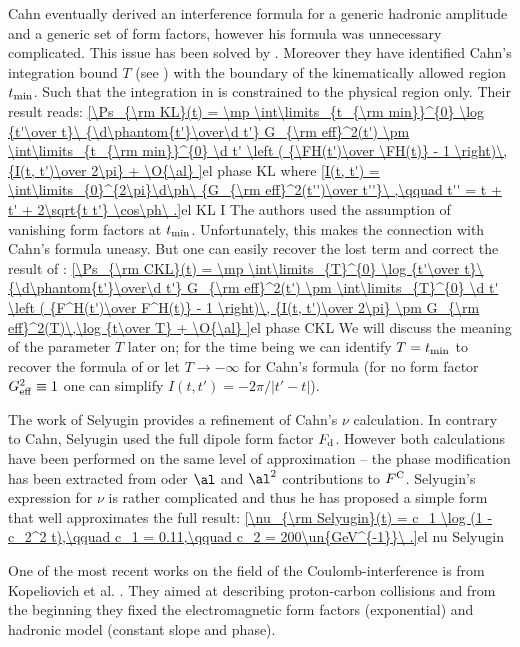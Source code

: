 Cahn eventually derived an interference formula for a generic hadronic amplitude and a generic set of form factors, however his formula was unnecessary complicated. This issue has been solved by \KaL{} . Moreover they have identified Cahn's integration bound $T$ (see ) with the boundary of the kinematically allowed region $t_{\rm min}$. Such that the integration in  is constrained to the physical region only. Their result reads:
\eqref{\Ps_{\rm KL}(t) =
	\mp \int\limits_{t_{\rm min}}^{0} \log {t'\over t}\ {\d\phantom{t'}\over\d t'} G_{\rm eff}^2(t')
	\pm \int\limits_{t_{\rm min}}^{0} \d t' \left ( {\FH(t')\over \FH(t)} - 1 \right)\, {I(t, t')\over 2\pi}
	+ \O{\al}
}{el phase KL}
where
\eqref{I(t, t') = \int\limits_{0}^{2\pi}\d\ph\ {G_{\rm eff}^2(t'')\over t''}\ ,\qquad t'' = t + t' + 2\sqrt{t t'} \cos\ph\ .}{el KL I}
The authors used the assumption of vanishing form factors at $t_{\rm min}$. Unfortunately, this makes the connection with Cahn's formula  uneasy. But one can easily recover the lost term and correct the result of \KL{}:
\eqref{\Ps_{\rm CKL}(t) =
	\mp \int\limits_{T}^{0} \log {t'\over t}\ {\d\phantom{t'}\over\d t'} G_{\rm eff}^2(t')
	\pm \int\limits_{T}^{0} \d t' \left ( {F^H(t')\over F^H(t)} - 1 \right)\, {I(t, t')\over 2\pi}
	\pm G_{\rm eff}^2(T)\,\log {t\over T}
	+ \O{\al}
}{el phase CKL}
We will discuss the meaning of the parameter $T$ later on; for the time being we can identify $T = t_{\rm min}$ to recover the formula of \KL{} or let $T\to -\infty$ for Cahn's formula (for no form factor $G_{\rm eff}^2 \equiv 1$ one can simplify $I(t, t') = -2\pi / |t' - t|$).

The work of Selyugin  provides a refinement of Cahn's $\nu$ calculation. In contrary to Cahn, Selyugin used the full dipole form factor $F_{\rm d}$. However both calculations have been performed on the same level of approximation -- the phase modification has been extracted from oder $\al$ and $\al^2$ contributions to $F^{\rm C}$. Selyugin's expression for $\nu$ is rather complicated and thus he has proposed a simple form that well approximates the full result:
\eqref{\nu_{\rm Selyugin}(t) = c_1 \log (1 - c_2^2 t),\qquad c_1 = 0.11,\qquad c_2 = 200\un{GeV^{-1}}\ .}{el nu Selyugin}

One of the most recent works on the field of the Coulomb-interference is from Kopeliovich et al. . They aimed at describing proton-carbon collisions and from the beginning they fixed the electromagnetic form factors (exponential) and hadronic model (constant slope and phase).

